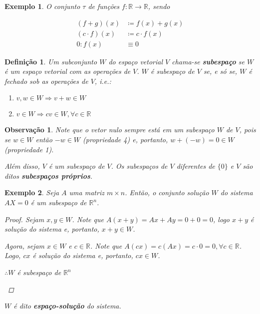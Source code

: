\documentclass{article}
\newtheorem*{remark}{Observação}
\newtheorem*{definition}{Definição}
\newtheorem*{example}{Exemplo}
\begin{document}
\begin{example}
	O conjunto $\tau$ de funções $f:\mathbb{R}\to\mathbb{R}$, sendo
	
	\begin{align*}
	(f + g)(x)&\coloneqq f(x) + g(x) \\
	(c\cdot f)(x)&\coloneqq c\cdot f(x) \\
	0: f(x)&\equiv 0
	\end{align*}
	
\end{example}

\begin{definition}
	Um subconjunto $W$ do espaço vetorial $V$ chama-se \textbf{subespaço} se $W$ é um espaço vetorial com as operações de $V$. $W$ é subespaço de $V$ se, e só se, $W$ é fechado sob as operações de $V$, i.e.:
	\begin{enumerate}
		\item $v,w\in W \Rightarrow v+w\in W$ 
		\item $v\in W \Rightarrow cv\in W, \forall c\in\mathbb{R}$
	\end{enumerate}
\end{definition}

\begin{remark}
	Note que o vetor nulo sempre está em um subespaço $W$ de $V$, pois se $w\in W$ então $-w\in W$ (propriedade 4) e, portanto, $w+(-w) = 0\in W$ (propriedade 1). 
	\par\vspace{0.3cm}\hspace{45pt} Além disso, $V$ é um subespaço de $V$. Os subespaços de $V$ diferentes de $\{0\}$ e $V$ são ditos \textbf{subespaços próprios}.
\end{remark}

\begin{example}
	Seja $A$ uma matriz $m\times n$. Então, o conjunto solução $W$ do sistema $AX = 0$ é um subespaço de $\mathbb{R}^n$.
	\begin{proof}
		Sejam $x,y\in W$. Note que $A(x + y) = Ax + Ay = 0 + 0 = 0$, logo $x + y$ é solução do sistema e, portanto, $x+y\in W$.
		\par\vspace{0.4cm}\hspace{12pt} Agora, sejam $x\in W$ e $c\in\mathbb{R}$. Note que $A(cx) = c(Ax) = c\cdot 0 = 0, \forall c\in\mathbb{R}$. Logo, $cx$ é solução do sistema e, portanto, $cx\in W$.
		\par\vspace{0.4cm}\begin{center}
			$\therefore W$ é subespaço de $\mathbb{R}^n$
		\end{center}
	\end{proof}
\par\vspace{0.3cm} $W$ é dito \textbf{espaço-solução} do sistema.
\end{example}
\end{document}
